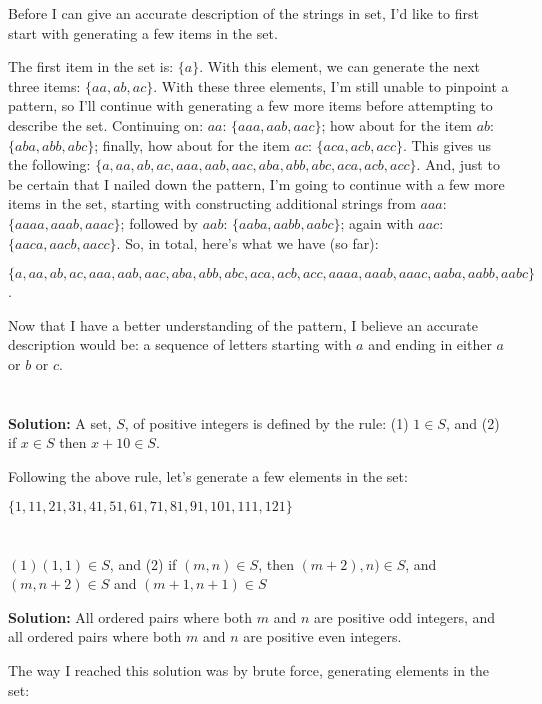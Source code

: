 \documentclass{article}
\begin{document}
Before I can give an accurate description of the strings in set, I'd like to first start with generating a few items in the set.

The first item in the set is: $\{a\}$. With this element, we can generate the next three items: $\{aa,ab,ac\}$.  With these three elements, I'm still unable to pinpoint a pattern, so I'll continue with generating a few more items before attempting to describe the set. Continuing on: $aa$: $\{aaa, aab, aac\}$; how about for the item $ab$: $\{aba, abb, abc\}$; finally, how about for the item $ac$: $\{aca, acb, acc\}$. This gives us the following: $\{a, aa, ab, ac, aaa, aab, aac, aba, abb, abc, aca, acb, acc\}$. And, just to be certain that I nailed down the pattern, I'm going to continue with a few more items in the set, starting with constructing additional strings from $aaa$: $\{aaaa, aaab, aaac\}$; followed by $aab$: $\{aaba, aabb, aabc\}$; again with $aac$: $\{aaca, aacb, aacc\}$. So, in total, here's what we have (so far): 

$\{a, aa, ab, ac, aaa, aab, aac, aba, abb, abc, aca, acb, acc, aaaa, aaab, aaac, aaba, aabb, aabc\}$.

Now that I have a better understanding of the pattern, I believe an accurate description would be: a sequence of letters starting with $a$ and ending in either $a$ or $b$ or $c$.

\section{}
\textbf{Solution:} A set, $S$, of positive integers is defined by the rule: (1) $1 \in S$, and (2) if $x \in S$ then $x + 10 \in S$.

Following the above rule, let's generate a few elements in the set:

$\{1, 11, 21, 31, 41, 51, 61, 71, 81, 91, 101, 111, 121\}$


\section{}

$(1)(1,1) \in S$, and (2) if $(m,n) \in S$, then $(m + 2), n) \in S$, and $(m, n + 2) \in S$ and $(m + 1, n + 1) \in S$ 

\textbf{Solution: } All ordered pairs where both $m$ and $n$ are positive odd integers, and all ordered pairs where both $m$ and $n$ are positive even integers.

The way I reached this solution was by brute force, generating elements in the set:
\end{document}
